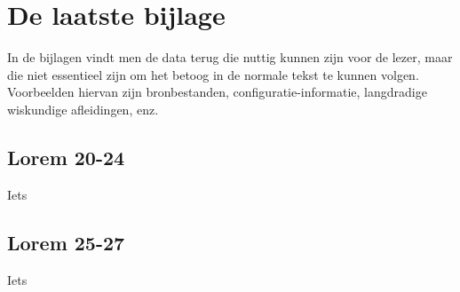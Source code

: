\chapter{De laatste bijlage}
\label{app:n}
In de bijlagen vindt men de data terug die nuttig kunnen zijn voor de
lezer, maar die niet essentieel zijn om het betoog in de normale tekst te
kunnen volgen. Voorbeelden hiervan zijn bronbestanden,
configuratie-informatie, langdradige wiskundige afleidingen, enz.

\section{Lorem 20-24}
Iets

\section{Lorem 25-27}
Iets

